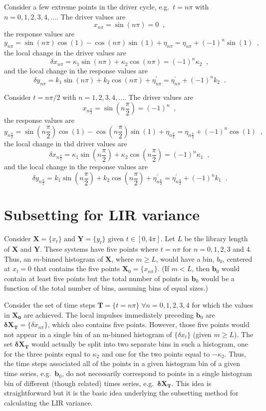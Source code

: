 \documentclass[a4paper,11pt]{article}
\begin{document}
Consider a few extreme points in the driver cycle, e.g.\ $t=n\pi$ with $n=0,1,2,3,4,\ldots$.  The driver values are
$$
x_{n\pi} = \sin(n\pi) = 0\;\;,
$$
the response values are
$$
y_{n\pi} = \sin(n\pi)\cos(1)-\cos(n\pi)\sin(1)+ \eta_{n\pi} = \eta_{n\pi} + \left(-1\right)^n\sin(1)\;\;,
$$
the local change in the driver values are
$$
\delta x_{n\pi} = \kappa_1\sin(n\pi)+\kappa_2\cos(n\pi) = \left(-1\right)^n \kappa_2\;\;,
$$
and the local change in the response values are
$$
\delta y_{n\pi} = k_1\sin(n\pi)+k_2\cos(n\pi)+\eta^\prime_{n\pi} = \eta^\prime_{n\pi} + \left(-1\right)^n k_2\;\;.
$$

Consider $t=n\pi/2$ with $n=1,2,3,4,\ldots$.  The driver values are
$$
x_{n\frac{\pi}{2}} = \sin\left(n\frac{\pi}{2}\right) = (-1)^n\;\;,
$$
the response values are
$$
y_{n\frac{\pi}{2}} = \sin\left(n\frac{\pi}{2}\right)\cos(1)-\cos\left(n\frac{\pi}{2}\right)\sin(1)+ \eta_{n\frac{\pi}{2}} = \eta_{n\frac{\pi}{2}} + (-1)^n\cos(1)\;\;,
$$
the local change in thd driver values are
$$
\delta x_{n\frac{\pi}{2}} = \kappa_1\sin\left(n\frac{\pi}{2}\right)+\kappa_2\cos\left(n\frac{\pi}{2}\right) = \left(-1\right)^n \kappa_1\;\;,
$$
and the local change in the response values are
$$
\delta y_{n\frac{\pi}{2}} = k_1\sin\left(n\frac{\pi}{2}\right)+k_2\cos\left(n\frac{\pi}{2}\right)+\eta^\prime_{n\frac{\pi}{2}} = \eta^\prime_{n\frac{\pi}{2}} + \left(-1\right)^n k_1\;\;.
$$

\section{Subsetting for LIR variance}
Consider $\mathbf{X}=\{x_t\}$ and $\mathbf{Y}=\{y_t\}$ given $t\in[0,4\pi]$.  Let $L$ be the library length of $\mathbf{X}$ and $\mathbf{Y}$.  These systems have five points where $t=n\pi$ for $n=0,1,2,3$ and $4$. Thus, an $m$-binned histogram of $\mathbf{X}$, where $m\ge L$, would have a bin, $b_0$, centered at $x_t=0$ that contains the five points $\mathbf{X}_{0} = \{x_{n\pi}\}$.  (If $m<L$, then $\mathbf{b}_0$ would contain at least five points but the total number of points in $\mathbf{b}_0$ would be a function of the total number of bins, assuming bins of equal sizes.)  

Consider the set of time steps $\mathbf{T}=\{t=n\pi\}\;\forall n=0,1,2,3,4$ for which the values in $\mathbf{X_0}$ are achieved.  The local impulses immediately preceding $\mathbf{b}_0$ are $\mathbf{\delta X}_\mathbf{T}=\{\delta x_{n\pi}\}$, which also contains five points.  However, those five points would not appear in a single bin of an m-binned histogram of $\{\delta x_t\}$ (given $m\ge L$).  The set $\mathbf{\delta X}_\mathbf{T}$ would actually be split into two separate bins in such a histogram, one for the three points equal to $\kappa_2$ and one for the two points equal to $-\kappa_2$.  Thus, the time steps associated all of the points in a given histogram bin of a given time series, e.g.\ $\mathbf{b}_0$, do not necessarily correspond to points in a single histogram bin of different (though related) times series, e.g.\ $\mathbf{\delta X}_\mathbf{T}$.  This idea is straightforward but it is the basic idea underlying the subsetting method for calculating the LIR variance.
\end{document}
